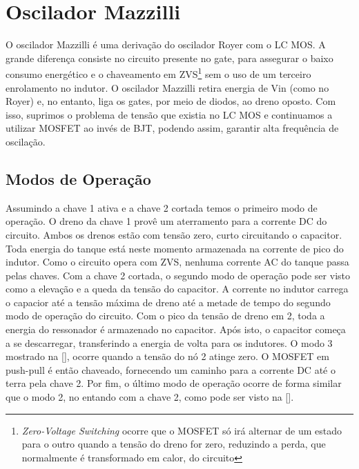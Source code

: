 \section{Oscilador Mazzilli}
O oscilador Mazzilli\cite{paolucci2009novel}\cite{mcclusky2010high} é uma derivação do oscilador Royer com o LC MOS. A grande diferença consiste no circuito presente no gate, para assegurar o baixo consumo energético e o chaveamento em ZVS\footnote{\emph{Zero-Voltage Switching} ocorre que o MOSFET só irá alternar de um estado para o outro quando a tensão do dreno for zero, reduzindo a perda, que normalmente é transformado em calor, do circuito} sem o uso de um terceiro enrolamento no indutor. O oscilador Mazzilli retira energia de Vin (como no Royer) e, no entanto, liga os gates, por meio de diodos, ao dreno oposto. Com isso, suprimos o problema de tensão que existia no LC MOS e continuamos a utilizar MOSFET ao invés de BJT, podendo assim, garantir alta frequência de oscilação.

\subsection{Modos de Operação}

Assumindo a chave 1 ativa e a chave 2 cortada temos o primeiro modo de operação. O dreno da chave 1 provê um aterramento para a corrente DC do circuito. Ambos os drenos estão com tensão zero, curto circuitando o capacitor. Toda energia do tanque está neste momento armazenada na corrente de pico do indutor. Como o circuito opera com ZVS, nenhuma corrente AC do tanque passa pelas chaves. Com a chave 2 cortada, o segundo modo de operação pode ser visto como a elevação e a queda da tensão do capacitor. A corrente no indutor carrega o capacior até a tensão máxima de dreno até a metade de tempo do segundo modo de operação do circuito. Com o pico da tensão de dreno em 2, toda a energia do ressonador é armazenado no capacitor. Após isto, o capacitor começa a se descarregar, transferindo a energia de volta para os indutores. O modo 3 mostrado na [], ocorre quando a tensão do nó 2 atinge zero. O MOSFET em push-pull é então chaveado, fornecendo um caminho para a corrente DC até o terra pela chave 2. Por fim, o último modo de operação ocorre de forma similar que o modo 2, no entando com a chave 2, como pode ser visto na [].

